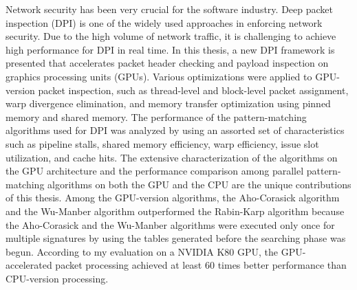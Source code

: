 \parindent 0.25in
Network security has been very crucial for the software industry. Deep packet inspection (DPI) is one of the widely used approaches in enforcing network security. Due to the high volume of network traffic, it is challenging to achieve high performance for DPI in real time. In this thesis, a new DPI framework is presented that accelerates packet header checking and payload inspection on graphics processing units (GPUs). Various optimizations were applied to GPU-version packet inspection, such as thread-level and block-level packet assignment, warp divergence elimination, and memory transfer optimization using pinned memory and shared memory. The performance of the pattern-matching algorithms used for DPI was analyzed by using an assorted set of characteristics such as pipeline stalls, shared memory efficiency, warp efficiency, issue slot utilization, and cache hits. The extensive characterization of the algorithms on the GPU architecture and the performance comparison among parallel pattern-matching algorithms on both the GPU and the CPU are the unique contributions of this thesis. Among the GPU-version algorithms, the Aho-Corasick algorithm and the Wu-Manber algorithm outperformed the Rabin-Karp algorithm because the Aho-Corasick and the Wu-Manber algorithms were executed only once for multiple signatures by using the tables generated before the searching phase was begun. According to my evaluation on a NVIDIA K80 GPU, the GPU-accelerated packet processing achieved at least 60 times better performance than CPU-version processing. 